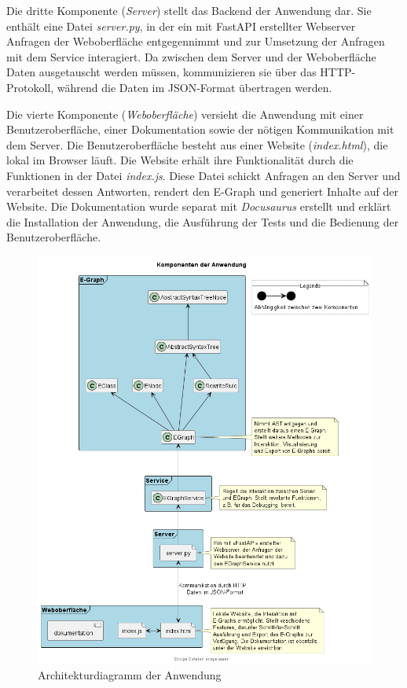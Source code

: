 Die dritte Komponente (\textit{Server}) stellt das Backend der Anwendung dar. Sie enthält eine Datei \textit{server.py}, in der ein mit FastAPI erstellter Webserver
Anfragen der Weboberfläche entgegennimmt und zur Umsetzung der Anfragen mit dem Service interagiert. Da zwischen dem Server und der Weboberfläche Daten ausgetauscht werden
müssen, kommunizieren sie über das HTTP-Protokoll, während die Daten im JSON-Format übertragen werden.

Die vierte Komponente (\textit{Weboberfläche}) versieht die Anwendung mit einer Benutzeroberfläche, einer Dokumentation sowie der nötigen Kommunikation mit dem Server.
Die Benutzeroberfläche besteht aus einer Website (\textit{index.html}), die lokal im Browser läuft. Die Website erhält ihre Funktionalität durch die Funktionen in der 
Datei \textit{index.js}. Diese Datei schickt Anfragen an den Server und verarbeitet dessen Antworten, rendert den E-Graph und generiert Inhalte auf der Website. 
Die Dokumentation wurde separat mit \textit{Docusaurus} erstellt und erklärt die Installation der Anwendung, die Ausführung der Tests und die Bedienung der Benutzeroberfläche.  

\begin{figure}[H]
  \centering
  \includegraphics[scale=0.6]{../fig/components.png}
  \caption{Architekturdiagramm der Anwendung}
  \label{fig:architektur}
\end{figure}

